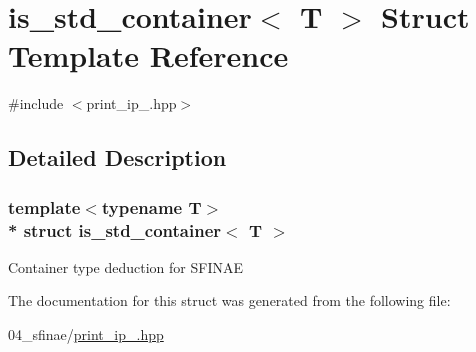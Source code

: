 \hypertarget{structis__std__container}{}\section{is\+\_\+std\+\_\+container$<$ T $>$ Struct Template Reference}
\label{structis__std__container}


{\ttfamily \#include $<$print\+\_\+ip\+\_.\+hpp$>$}



\subsection{Detailed Description}
\subsubsection*{template$<$typename T$>$\\*
struct is\+\_\+std\+\_\+container$<$ T $>$}

Container type deduction for S\+F\+I\+N\+AE 

The documentation for this struct was generated from the following file\+:\begin{DoxyCompactItemize}
\item 
04\+\_\+sfinae/\hyperlink{print__ip__04_8hpp}{print\+\_\+ip\+\_.\+hpp}\end{DoxyCompactItemize}
